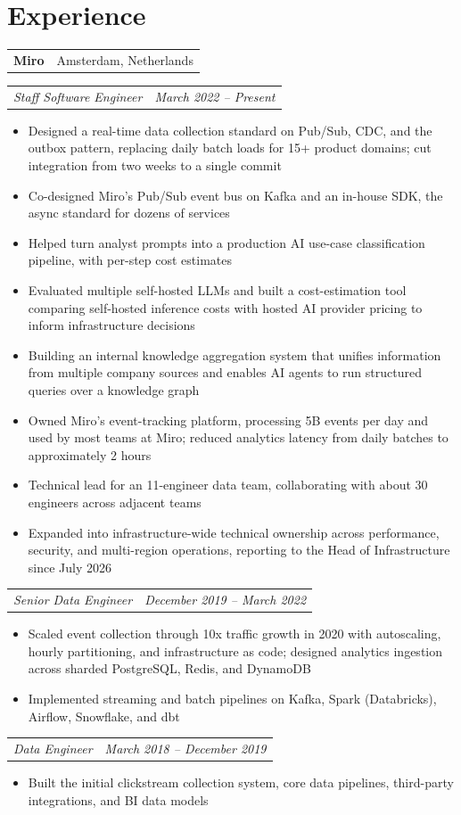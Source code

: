 \documentclass[a4paper,10pt]{article}
\makeatletter
\newcommand{\company}[2]{%
  \vspace{0.32em}%
  \noindent\begin{tabular*}{\textwidth}[t]{@{}l@{\extracolsep{\fill}}r@{}}%
    \textbf{#1} & #2 \\%
  \end{tabular*}%
  \par%
}
\newcommand{\position}[2]{%
  \vspace{0.12em}%
  \noindent\begin{tabular*}{\textwidth}[t]{@{}l@{\extracolsep{\fill}}r@{}}%
    \textit{#1} & \textit{#2} \\%
  \end{tabular*}%
  \par%
}
\makeatother
\begin{document}
\section{Experience}
\company{Miro}{Amsterdam, Netherlands}
\position{Staff Software Engineer}{March 2022 -- Present}
\begin{itemize}
  \item Designed a real-time data collection standard on Pub/Sub, CDC, and the outbox pattern, replacing daily batch loads for 15+ product domains; cut integration from two weeks to a single commit
  \item Co-designed Miro's Pub/Sub event bus on Kafka and an in-house SDK, the async standard for dozens of services
  \item Helped turn analyst prompts into a production AI use-case classification pipeline, with per-step cost estimates
  \item Evaluated multiple self-hosted LLMs and built a cost-estimation tool comparing self-hosted inference costs with hosted AI provider pricing to inform infrastructure decisions
  \item Building an internal knowledge aggregation system that unifies information from multiple company sources and enables AI agents to run structured queries over a knowledge graph
  \item Owned Miro's event-tracking platform, processing 5B events per day and used by most teams at Miro; reduced analytics latency from daily batches to approximately 2 hours
  \item Technical lead for an 11-engineer data team, collaborating with about 30 engineers across adjacent teams
  \item Expanded into infrastructure-wide technical ownership across performance, security, and multi-region operations, reporting to the Head of Infrastructure since July 2026
\end{itemize}
\position{Senior Data Engineer}{December 2019 -- March 2022}
\begin{itemize}
  \item Scaled event collection through 10x traffic growth in 2020 with autoscaling, hourly partitioning, and infrastructure as code; designed analytics ingestion across sharded PostgreSQL, Redis, and DynamoDB
  \item Implemented streaming and batch pipelines on Kafka, Spark (Databricks), Airflow, Snowflake, and dbt
\end{itemize}
\position{Data Engineer}{March 2018 -- December 2019}
\begin{itemize}
  \item Built the initial clickstream collection system, core data pipelines, third-party integrations, and BI data models
\end{itemize}
\end{document}
